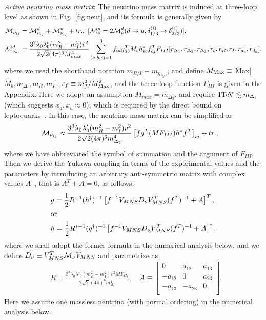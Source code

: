 \documentclass[%
showkeys,12pt,
preprint,preprintnumbers,nofootinbib,
groupedaddress,superscriptaddress,amsmath,amssymb]{revtex4}
\newcommand{\nn}{\nonumber}
\numberwithin{equation}{section}
\begin{document}
{\it Active neutrino mass matrix}:
The neutrino mass matrix is induced at three-loop level as shown 
in Fig.~\ref{fig:neut}, and its formula 
is generally given by 
\begin{align}
{\cal M}_{\nu_{ij}}&={\cal M}_{\nu_{ij}}^d + {\cal M}_{\nu_{ij}}^u +  tr.
,\ [ {\cal M}_{\nu}^u=2 {\cal M}_{\nu}^d(d\to u,\delta_{1/3}^{(i)}\to \delta_{2/3}^{(i)})],\\
{\cal M}_{\nu_{ab}}^d&=
\frac{3^2\lambda_0\lambda'_0(m_R^2 - m_I^2)v^2}{2\sqrt2(4\pi)^6 M^4_{max}} \sum_{(a,b,c)=1}^3 
f_{ia}g^T_{ab} M_b h^*_{bc} f^T_{cj} 
F_{III}[r_{\Delta_1},r_{\Delta_2} ,  r_{\Delta_3}, r_{b}, r_{R},r_{I},r_{d_c}, r_{d_a}],
\end{align}
where we used the shorthand notation $m_{R/I}\equiv m_{\eta_{R/I}}$, and 
define $M_{\rm Max}\equiv$ Max[$M_b,m_{\Delta_i}, m_{R}, m_I$], 
$r_f\equiv m_f^2/M_{\rm Max}^2$, and the three-loop function $F_{III}$ 
is given in the Appendix.
Here we adopt an assumption $M_{max}=m_{\Delta_3}$, and require 
$1{\rm TeV}\lesssim m_{\Delta_i}$ (which suggests $x_d,x_u\approx0$), which 
is {required by the direct bound on leptoquarks~\cite{Cheung:2016frv}. }
In this case, the neutrino mass matrix can be simplified as
\begin{align}
{\cal M}_{\nu_{ij}}&\approx
\frac{3^3\lambda_0\lambda'_0(m_R^2 - m_I^2)v^2}{2\sqrt2(4\pi)^6 m^4_{\Delta_3}}
\left[f g^T (M F_{III}) h^*  f^T\right]_{ij} + tr.,
\end{align}
 where we have abbreviated the symbol of summation and the 
argument of $F_{III}$.
Then we derive the Yukawa coupling in terms of the experimental values 
and the parameters by introducing an arbitrary anti-symmetric matrix 
with complex values $A$~\cite{Okada:2015vwh}, that is  $A ^T +A=0$, as follows:
 \begin{align}
& g=\frac12 R^{-1} (h^\dag)^{-1}\left[f^{-1} V_{MNS} D_\nu V_{MNS}^T (f^T)^{-1} + A \right]^T,\\
& {\rm or}\nn\\
 & h=\frac12 R^{*-1} (g^\dag)^{-1}\left[f^{-1} V_{MNS} D_\nu V_{MNS}^T (f^T)^{-1} + A \right]^*,
  \end{align}
 where we shall adopt the former formula in the numerical analysis below, 
and we define $D_\nu\equiv V_{MNS}^T  {\cal M}_\nu V_{MNS}$ and  parametrize as 
\begin{align}
 & R=\frac{3^3\lambda_0\lambda'_0(m_R^2 - m_I^2)v^2 MF_{III}}{2\sqrt2(4\pi)^6 m^4_{\Delta_3}},\quad
A\equiv
 \left[\begin{array}{ccc} 
0 &a_{12} & a_{13} \\
-a_{12} & 0 & a_{23} \\
-a_{13} & -a_{23} & 0 \\
  \end{array}
\right].
\end{align}
Here we assume one massless neutrino (with normal ordering) in the 
numerical analysis below.
\end{document}
